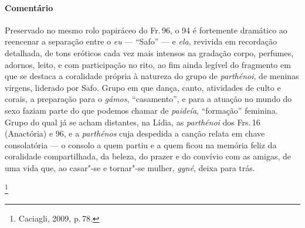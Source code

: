 {\paragraph{Comentário} Preservado no mesmo rolo papiráceo do Fr.\,96, o 94 é fortemente dramático ao
reencenar a separação entre o \emph{eu} --- ``Safo'' --- e \emph{ela}, revivida em
recordação detalhada, de tons eróticos cada vez mais intensos na
gradação corpo, perfumes, adornos, leito, e com participação no rito,
ao fim ainda legível do fragmento em que se destaca a coralidade própria à natureza do grupo de \emph{parthénoi}, de meninas virgens, liderado por Safo. Grupo em que dança, canto, atividades de culto e corais, a preparação para o \emph{gámos}, ``casamento'', e para a atuação no mundo do sexo faziam parte do que podemos chamar de \emph{paideía}, ``formação'' feminina. Grupo do qual já se acham distantes, na Lídia, as \emph{parthénoi} dos Frs.\,16 (Anactória) e 96, e a \emph{parthénos} cuja despedida a canção relata em chave consolatória --- o consolo a quem partiu e a quem ficou na memória feliz da coralidade compartilhada, da beleza, do prazer e do convívio com as amigas, de uma vida que, ao casar"-se e tornar"-se mulher, \emph{gyné}, deixa para trás.

\footnote{Caciagli, 2009, p.\,78.}
}





% 

